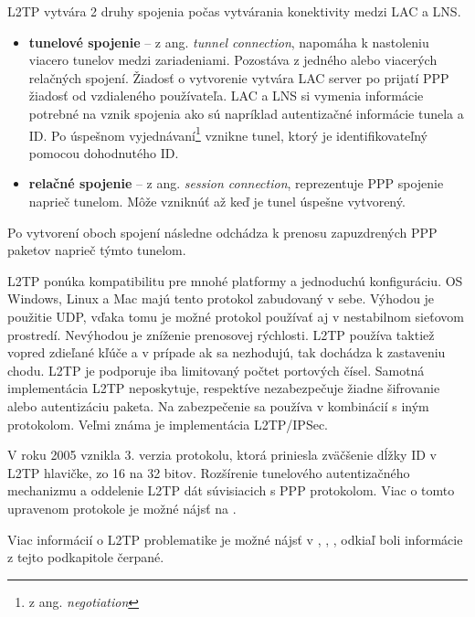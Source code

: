 L2TP vytvára 2 druhy spojenia počas vytvárania konektivity medzi LAC a LNS. 
\begin{itemize}
	\item{\textbf{tunelové spojenie}} -- z ang. \textit{tunnel connection}, napomáha k nastoleniu viacero tunelov medzi zariadeniami. Pozostáva z jedného alebo viacerých relačných spojení. Žiadosť o vytvorenie vytvára LAC server po prijatí PPP žiadosť od vzdialeného používateľa. LAC a LNS si vymenia informácie potrebné na vznik spojenia ako sú napríklad autentizačné informácie tunela a ID. Po úspešnom vyjednávaní\footnote{z ang. \textit{negotiation}} vznikne tunel, ktorý je identifikovateľný pomocou dohodnutého ID.  
	\item{\textbf{relačné spojenie}} -- z ang. \textit{session connection}, reprezentuje PPP spojenie naprieč tunelom. Môže vzniknúť až keď je tunel úspešne vytvorený.	
\end{itemize}     
Po vytvorení oboch spojení následne odchádza k prenosu zapuzdrených PPP paketov naprieč týmto tunelom.

L2TP ponúka kompatibilitu pre mnohé platformy a jednoduchú konfiguráciu. OS Windows, Linux a Mac majú tento protokol zabudovaný v sebe. Výhodou je použitie UDP, vďaka tomu je možné protokol používať aj v nestabilnom sieťovom prostredí.
Nevýhodou je zníženie prenosovej rýchlosti. L2TP používa taktiež vopred zdieľané kľúče a v prípade ak sa nezhodujú, tak dochádza k zastaveniu chodu. L2TP je podporuje iba limitovaný počtet portových čísel. Samotná implementácia L2TP neposkytuje, respektíve nezabezpečuje žiadne šifrovanie alebo autentizáciu paketa. Na zabezpečenie sa používa v kombinácií s iným protokolom. Veľmi známa je implementácia L2TP/IPSec. 

V roku 2005 vznikla 3. verzia protokolu, ktorá priniesla zväčšenie dĺžky ID v L2TP hlavičke, zo 16 na 32 bitov. Rozšírenie tunelového autentizačného mechanizmu a oddelenie L2TP dát súvisiacich s PPP protokolom. Viac o tomto upravenom protokole je možné nájsť na \cite{l2tpv3}.
  
Viac informácií o L2TP problematike je možné nájsť v \cite{l2tp}, \cite{rfc2661}, \cite{l2tphuawei}, odkiaľ boli informácie z tejto podkapitole čerpané. 

